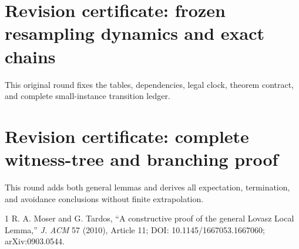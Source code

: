 \documentclass[10pt]{article}
\begin{document}
\ifnum{}
\section*{Revision certificate: frozen resampling dynamics and exact chains}
This original round fixes the tables, dependencies, legal clock, theorem
contract, and complete small-instance transition ledger.
\fi
\ifnum{}
\section*{Revision certificate: complete witness-tree and branching proof}
This round adds both general lemmas and derives all expectation, termination,
and avoidance conclusions without finite extrapolation.
\fi

\begin{thebibliography}{1}
 R. A. Moser and G. Tardos, ``A constructive proof of the general
Lovasz Local Lemma,'' \emph{J. ACM} 57 (2010), Article 11;
DOI: 10.1145/1667053.1667060; arXiv:0903.0544.
\end{thebibliography}
\end{document}
